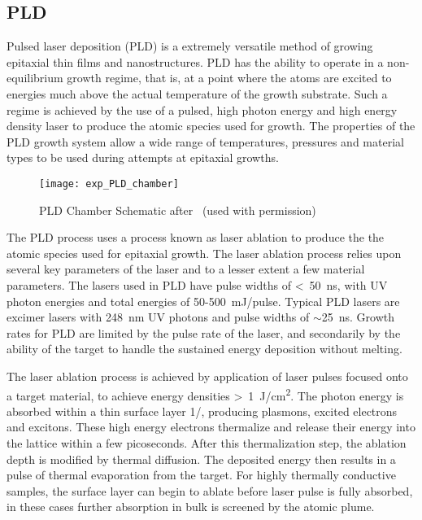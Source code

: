 \subsection{PLD} Pulsed laser deposition (PLD) is a extremely versatile method of growing epitaxial thin films and nanostructures.
PLD has the ability to operate in a non-equilibrium growth regime, that is, at a point where the atoms are excited to energies much above the actual temperature of the growth substrate.
Such a regime is achieved by the use of a pulsed, high photon energy and high energy density laser to produce the atomic species used for growth.
The properties of the PLD growth system allow a wide range of temperatures, pressures and material types to be used during attempts at epitaxial growths.
\begin{figure}
 \centering \texttt{[image: exp\_PLD\_chamber]}
 \caption{\label{fig:exp_pld_chamber}PLD Chamber Schematic after~\cite{stephen-thesis} (used with permission)}
\end{figure}

The PLD process uses a process known as laser ablation to produce the the atomic species used for epitaxial growth.
The laser ablation process relies upon several key parameters of the laser and to a lesser extent a few material parameters.
The lasers used in PLD have pulse widths of <~50~ns, with UV photon energies and total energies of 50-500~mJ/pulse.
Typical PLD lasers are excimer lasers with 248~nm UV photons and pulse widths of \(\sim\)25~ns.
Growth rates for PLD are limited by the pulse rate of the laser, and secondarily by the ability of the target to handle the sustained energy deposition without melting.

The laser ablation process is achieved by application of laser pulses focused onto a target material, to achieve energy densities >~1~J/cm\textsuperscript{2}.
The photon energy is absorbed within a thin surface layer 1/\textalpha{}, producing plasmons, excited electrons and excitons\cite{Willmott2000}.
These high energy electrons thermalize and release their energy into the lattice within a few picoseconds.
After this thermalization step, the ablation depth is modified by thermal diffusion.
The deposited energy then results in a pulse of thermal evaporation from the target.
For highly thermally conductive samples, the surface layer can begin to ablate before laser pulse is fully absorbed, in these cases further absorption in bulk is screened by the atomic plume\cite{Willmott2000}.

